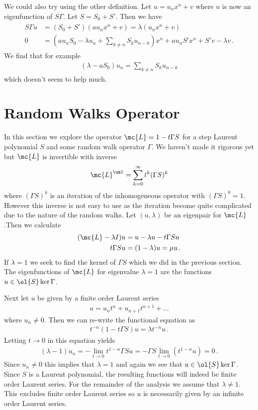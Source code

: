 We could also try using the other definition. Let $u = u_nx^n + v$ where $u$ is now an eigenfunction of $S\Gamma$. Let $S = S_0 + S'$. Then we have
\begin{align}\begin{split}
	S\Gamma u &= (S_0+S')(au_nx^n+v) = \lambda(u_nx^n+v)\\
	0&=(au_nS_0-\lambda u_n+\sum_{k\neq n}S_k u_{n-k})x^n  + au_nS'x^n+S'v-\lambda v \,.
\end{split}\end{align}
We find that for example
\begin{align}
	(\lambda - a S_0)u_n = \sum_{k\neq n}S_k u_{n-k}
\end{align}
which doesn't seem to help much. 

\section{Random Walks Operator}
In this section we explore the operator $\mc{L} = 1 - t\Gamma S$ for a step Laurent polynomial $S$ and some random walk operator $\Gamma$. We haven't made it rigorous yet but $\mc{L}$ is invertible with inverse
\begin{align}
	{\mc{L}}^{\um 1} = \sum_{k=0}^{\infty}t^k(\Gamma S)^k
\end{align}
where $(\Gamma S)^k$ is an iteration of the inhomogeneous operator with $(\Gamma S)^0 = 1$. However this inverse is not easy to use as the iteration become quite complicated due to the nature of the random walks. Let $(u, \lambda)$ be an eigenpair for $\mc{L}$.Then we calculate
\begin{align}\begin{split}
	(\mc{L}-\lambda I) u &= u - \lambda u -t\Gamma Su\\
	t \Gamma S u &= (1-\lambda)u = \mu u\,.
\end{split}\end{align}
If $\lambda = 1$ we seek to find the kernel of $\Gamma S$ which we did in the previous section. The eigenfunctions of $\mc{L}$ for eigenvalue $\lambda = 1$ are the functions $u \in \ol{S}\ker{\Gamma}$.

Next let $u$ be given by a finite order Laurent series
\begin{align}
	u = u_n t^n + u_{n+1}t^{n+1} + \ldots
\end{align}
where $u_n \neq 0$. Then we can re-write the functional equation as
\begin{align}
	t^{-n}(1-t\Gamma S)u = \lambda t^{-n}u\,.
\end{align}
Letting $t \to 0$ in this equation yields
\begin{align}
	(\lambda - 1)u_n = -\lim_{t\to 0} t^{1-n}\Gamma S u = -\Gamma S \lim_{t\to 0} (t^{1-n} u) = 0\,.
\end{align}
Since $u_n \neq 0$ this implies that $\lambda = 1$ and again we see that $u \in \ol{S}\ker \Gamma$. Since $S$ is a Laurent polynomial, the resulting functions will indeed be finite order Laurent series. For the remainder of the analysis we assume that $\lambda \neq 1$. This excludes finite order Laurent series so $u$ is necessarily given by an infinite order Laurent series.


